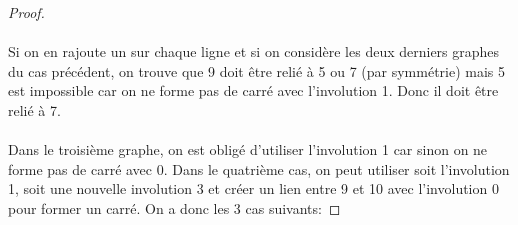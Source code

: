 \documentclass[a4paper]{article}
\theoremstyle{mytheorem}
\begin{document}
\begin{proof}
  \begin{center}
  \end{center}

  \paragraph{}
  Si on en rajoute un sur chaque ligne et si on considère les deux derniers graphes du cas précédent, on trouve que 9 doit être relié à 5 ou 7 (par symmétrie) mais 5 est impossible car on ne forme pas de carré avec l'involution 1. Donc il doit être relié à 7.

  \paragraph{}
  Dans le troisième graphe, on est obligé d'utiliser l'involution 1 car sinon on ne forme pas de carré avec 0. Dans le quatrième cas, on peut utiliser soit l'involution 1, soit une nouvelle involution 3 et créer un lien entre 9 et 10 avec l'involution 0 pour former un carré. On a donc les 3 cas suivants:


\end{proof}
\end{document}
